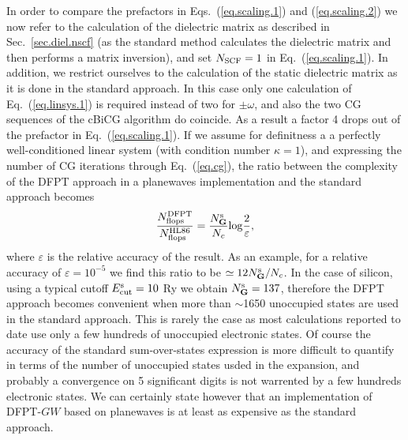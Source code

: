 \documentclass[twocolumn,prb,showpacs,superscriptaddress]{revtex4}
\def\w{\omega}
\def\G{{\bf G}}
\begin{document}
In order to compare the prefactors in Eqs.\ (\ref{eq.scaling.1}) and (\ref{eq.scaling.2})
we now refer to the calculation of the dielectric matrix as described in Sec.\ \ref{sec.diel.nscf}
(as the standard method calculates the dielectric matrix and then performs a matrix inversion),
and set $N_{\rm SCF}=1$ in Eq.\ (\ref{eq.scaling.1}). In addition, we restrict ourselves to
the calculation of the static dielectric matrix as it is done in the standard approach.
In this case only one calculation of Eq.\ (\ref{eq.linsys.1}) is required instead of two for $\pm\w$, 
and also the two CG sequences of the cBiCG algorithm do coincide.
As a result a factor 4 drops out of the prefactor in Eq.\ (\ref{eq.scaling.1}).
If we assume for definitness a a perfectly well-conditioned linear system (with condition number $\kappa=1$),
and expressing the number of CG iterations through Eq.\ (\ref{eq.cg}),
the ratio between the complexity of the DFPT approach in a planewaves
implementation and the standard approach becomes
   \begin{equation}\label{eq.ratio.flops}
   \frac{N^{\rm DFPT}_{\rm flops}}{N^{\rm HL86}_{\rm flops}} = \frac{N_\G^{\rm s}}{N_c} {\rm log}\frac{2}{\varepsilon},
   \end{equation}
where $\varepsilon$ is the relative accuracy of the result.
As an example, for a relative accuracy of $\varepsilon=10^{-5}$ 
we find this ratio to be $\simeq 12 N_\G^{\rm s}/N_c$.
In the case of silicon, using a typical cutoff $E_{\rm cut}^{\rm s}=10$ Ry we obtain $N_\G^{\rm s}=137$, therefore
the DFPT approach becomes convenient when more than $\sim$1650 unoccupied states are used
in the standard approach.
This is rarely the case as most calculations reported to date use only a few hundreds of 
unoccupied electronic states.
Of course the accuracy of the standard sum-over-states expression is more difficult to
quantify in terms of the number of unoccupied states usded in the expansion, and probably
a convergence on 5 significant digits is not warrented by a few
hundreds electronic states. We can certainly state however that an implementation of DFPT-$GW$ 
based on planewaves is at least as expensive as the standard approach.
\end{document}
